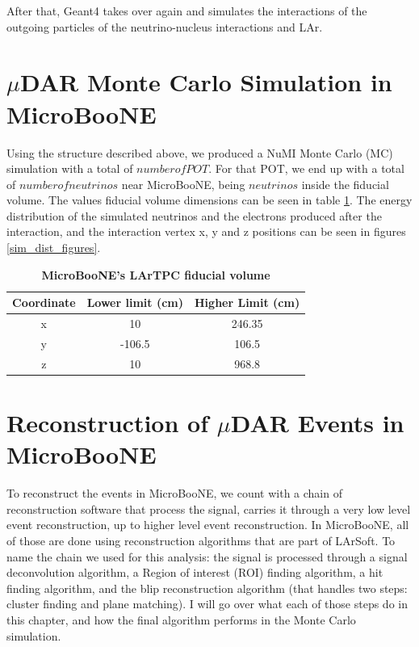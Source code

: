 After that, Geant4 takes over again and simulates the interactions of the outgoing particles of the neutrino-nucleus interactions and LAr. 

\section{$\mu$DAR Monte Carlo Simulation in MicroBooNE}

Using the structure described above, we produced a NuMI Monte Carlo (MC) simulation with a total of $number of POT$. For that POT, we end up with a total of $number of neutrinos$ near MicroBooNE, being $neutrinos$ inside the fiducial volume. The values fiducial volume dimensions can be seen in table \ref{fiducial}. The energy distribution of the simulated neutrinos and the electrons produced after the interaction, and the interaction vertex x, y and z positions can be seen in figures \ref{sim_dist_figures}.  

\begin{table}
	\begin{center}
		\begin{tabular}{ccc}
			\bottomrule
						 \textbf{Coordinate}	&	\textbf{Lower limit (cm)}	&	\textbf{Higher Limit (cm)}\\
			\toprule
			x &	10 & 246.35 \\ 
			y &	-106.5 & 106.5 \\
			z &	10 & 968.8 \\ 
			\toprule
		\end{tabular}
		\caption[MicroBooNE's LArTPC fiducial volume]{{\textbf{MicroBooNE's LArTPC fiducial volume}}}
		\label{fiducial}
	\end{center}
\end{table}



\section{Reconstruction of $\mu$DAR Events in MicroBooNE}

To reconstruct the events in MicroBooNE, we count with a chain of reconstruction software that process the signal, carries it through a very low level event reconstruction, up to higher level event reconstruction. In MicroBooNE, all of those are done using reconstruction algorithms that are part of LArSoft. To name the chain we used for this analysis: the signal is processed through a signal deconvolution algorithm, a Region of interest (ROI) finding algorithm, a hit finding algorithm, and the blip reconstruction algorithm (that handles two steps: cluster finding and plane matching). I will go over what each of those steps do in this chapter, and how the final algorithm performs in the Monte Carlo simulation.  

